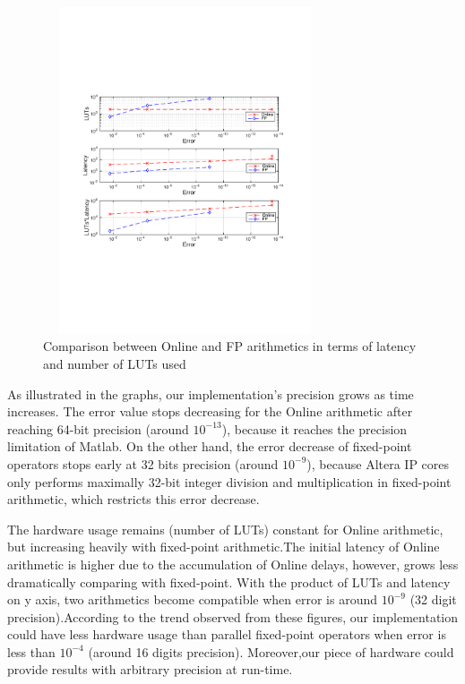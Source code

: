 \documentclass{sig-alternate}
\begin{document}
\begin{figure} [ht]
	\centering
	\includegraphics[width= 3.3in, height = 3.8in]{figure101}
	\caption{Comparison between Online and FP arithmetics in terms of latency and number of LUTs used}
\end{figure}
\vspace{-10pt}

As illustrated in the graphs, our implementation's precision grows as time increases. The error value stops decreasing for the Online arithmetic after reaching 64-bit precision (around $10^{-13}$), because it reaches the precision limitation of Matlab. On the other hand, the error decrease of fixed-point operators stops early at 32 bits precision (around $10^{-9}$), because Altera IP cores only performs maximally 32-bit integer division and multiplication in fixed-point arithmetic\cite{altera}, which restricts this error decrease.    

The hardware usage remains (number of LUTs) constant for Online arithmetic, but increasing heavily with fixed-point arithmetic.The initial latency of Online arithmetic is higher due to the accumulation of Online delays, however, grows less dramatically comparing with fixed-point. With the product of LUTs and latency on y axis, two arithmetics become compatible when error is around $10^{-9}$ (32 digit precision).According to the trend observed from these figures, our implementation could have less hardware usage than parallel fixed-point operators when error is less than $10^{-4}$ (around 16 digits precision). Moreover,our piece of hardware could provide results with arbitrary precision at run-time.
\end{document}
